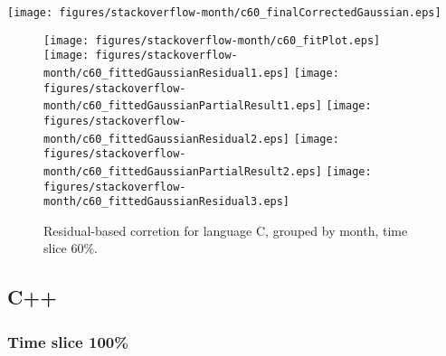 \begin{center}
{\texttt{[image: figures/stackoverflow-month/c60\_finalCorrectedGaussian.eps]}}
\end{center}

\FloatBarrier

\begin{figure}[t]
\centering
{}
{\texttt{[image: figures/stackoverflow-month/c60\_fitPlot.eps]}}
{\texttt{[image: figures/stackoverflow-month/c60\_fittedGaussianResidual1.eps]}}
{\texttt{[image: figures/stackoverflow-month/c60\_fittedGaussianPartialResult1.eps]}}
{\texttt{[image: figures/stackoverflow-month/c60\_fittedGaussianResidual2.eps]}}
{\texttt{[image: figures/stackoverflow-month/c60\_fittedGaussianPartialResult2.eps]}}
{\texttt{[image: figures/stackoverflow-month/c60\_fittedGaussianResidual3.eps]}}
\caption{Residual-based corretion for language C, grouped by month, time slice 60\%.}
\end{figure}


\FloatBarrier


\subsection{C++}

\subsubsection{Time slice 100\%}

